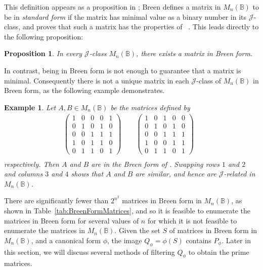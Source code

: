 \documentclass[11pt]{article}
\newtheorem{prop}[thm]{Proposition}
\newtheorem{exa}[thm]{Example}
\newenvironment{ex}{\begin{exa}\rm}{\end{exa}}
\numberwithin{equation}{section}
\newcommand{\B}{\mathbb{B}}
\newcommand{\Bn}{M_n(\B)}
\newcommand{\J}{\mathscr{J}}
\begin{document}
This definition appears as a proposition in \cite{Breen1997aa}; Breen defines a
matrix in $\Bn$ to be in \emph{standard form} if the matrix has minimal value as
a binary number in its $\J$-class, and proves that such a matrix has the
properties of ~\cite[Proposition 3.6]{Breen1997aa}. This leads
directly to the following proposition:

\begin{prop}
  In every $\J$-class $\Bn$, there exists a matrix in Breen form. 
\end{prop}

In contrast, being in Breen form is not enough to guarantee that a matrix is
minimal. Consequently there is not a unique matrix in each $\J$-class of $\Bn$
in Breen form, as the following example demonstrates. 
\begin{ex}
Let $A, B \in \Bn$ be the matrices defined by
\begin{align*}
  \begin{pmatrix}
    1 & 0 & 0 & 0 & 1 \\
    0 & 1 & 0 & 1 & 0 \\
    0 & 0 & 1 & 1 & 1 \\
    1 & 0 & 1 & 1 & 0 \\
    0 & 1 & 1 & 0 & 1 
  \end{pmatrix}\quad \quad
  \begin{pmatrix}
    1 & 0 & 1 & 0 & 0 \\
    0 & 1 & 0 & 1 & 0 \\
    0 & 0 & 1 & 1 & 1 \\
    1 & 0 & 0 & 1 & 1 \\
    0 & 1 & 1 & 0 & 1 
  \end{pmatrix}&\\
\end{align*}
respectively. Then $A$ and $B$ are in the Breen form of
. Swapping rows $1$ and $2$ and columns $3$
and $4$ shows that $A$ and $B$ are similar, and hence are $\J$-related in $\Bn$.
\end{ex}

There are significantly fewer than $2^{n^2}$ matrices in Breen form in $\Bn$,
as shown in Table~\ref{tab:BreenFormMatrices}, and so it is feasible to
enumerate the matrices in Breen form for several values of $n$ for which it
is not feasible to enumerate the matrices in $\Bn$.
Given the set $S$ of matrices in Breen form in $\Bn$, and a canonical form
$\phi$, the image $Q_\phi = \phi(S)$ contains $P_\phi$. Later in this section,
we will discuss several methods of filtering $Q_\phi$ to obtain the prime
matrices. 
\end{document}
